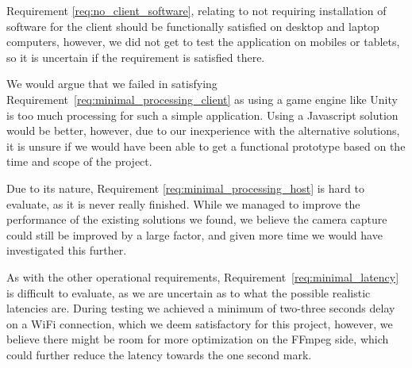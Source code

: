 Requirement \ref{req:no_client_software}, relating to not requiring installation of software for the client should be functionally satisfied on desktop and laptop computers, however, we did not get to test the application on mobiles or tablets, so it is uncertain if the requirement is satisfied there. 

We would argue that we failed in satisfying Requirement~\ref{req:minimal_processing_client} as using a game engine like Unity is too much processing for such a simple application. Using a Javascript solution would be better, however, due to our inexperience with the alternative solutions, it is unsure if we would have been able to get a functional prototype based on the time and scope of the project.

Due to its nature, Requirement \ref{req:minimal_processing_host} is hard to evaluate, as it is never really finished. While we managed to improve the performance of the existing solutions we found, we believe the camera capture could still be improved by a large factor, and given more time we would have investigated this further.

As with the other operational requirements, Requirement~\ref{req:minimal_latency} is difficult to evaluate, as we are uncertain as to what the possible realistic latencies are. During testing we achieved a minimum of two-three seconds delay on a WiFi connection, which we deem satisfactory for this project, however, we believe there might be room for more optimization on the FFmpeg side, which could further reduce the latency towards the one second mark.
